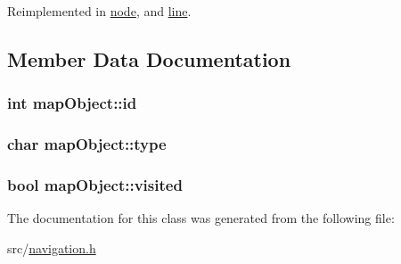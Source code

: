 \-Reimplemented in \hyperlink{classnode_ac98d07dd8f7b70e16ccb9a01abf56b9c}{node}, and \hyperlink{classline_ac98d07dd8f7b70e16ccb9a01abf56b9c}{line}.



\subsection{\-Member \-Data \-Documentation}
\hypertarget{classmapObject_ae1411b40c45164b29cf6116ff3b83a80}{
\subsubsection[{id}]{\setlength{\rightskip}{0pt plus 5cm}int {\bf map\-Object\-::id}}}\label{classmapObject_ae1411b40c45164b29cf6116ff3b83a80}
\hypertarget{classmapObject_acb23f5f8b902a799f97d9668f8cad645}{
\subsubsection[{type}]{\setlength{\rightskip}{0pt plus 5cm}char {\bf map\-Object\-::type}}}\label{classmapObject_acb23f5f8b902a799f97d9668f8cad645}
\hypertarget{classmapObject_ac1d84a75e600aa06acebf141ded18976}{
\subsubsection[{visited}]{\setlength{\rightskip}{0pt plus 5cm}bool {\bf map\-Object\-::visited}}}\label{classmapObject_ac1d84a75e600aa06acebf141ded18976}


\-The documentation for this class was generated from the following file\-:\begin{DoxyCompactItemize}
\item 
src/\hyperlink{navigation_8h}{navigation.\-h}\end{DoxyCompactItemize}
